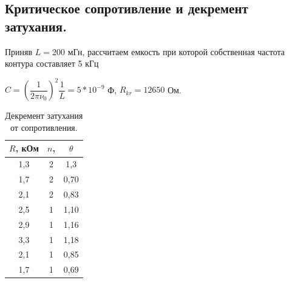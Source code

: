 \documentclass[a4paper, 12pt]{article}%
\begin{document}
\newpage
\subsection*{Критическое сопротивление и декремент затухания.}
Приняв $ L = 200 $ мГн, рассчитаем емкость при которой собственная частота контура составляет 5 кГц
\begin{center}
$ C = (\dfrac{1}{2 \pi \nu_{0}})^{2} \dfrac{1}{L} = 5 * 10^{-9} $ Ф, $ R_{kr} = 12650$ Ом.
\end{center}



\begin{table}[h!]
\begin{center}

\begin{tabular}{|c|c|c|}
\hline
$R$, кОм & $n$, & $\theta$   \\ \hline
1,3        & 2 &  1,3    \\ \hline
1,7      & 2  &  0,70  \\ \hline
2,1      & 2    & 0,83 \\ \hline
2,5 & 1 & 1,10 \\ \hline
2,9 & 1 & 1,16 \\ \hline
3,3 & 1 & 1,18 \\ \hline
2,1 & 1 & 0,85 \\ \hline
1,7 & 1 & 0,69 \\ \hline

\end{tabular}
\caption{Декремент затухания от сопротивления.}
\end{center}
\end{table}

\newpage
\end{document}
